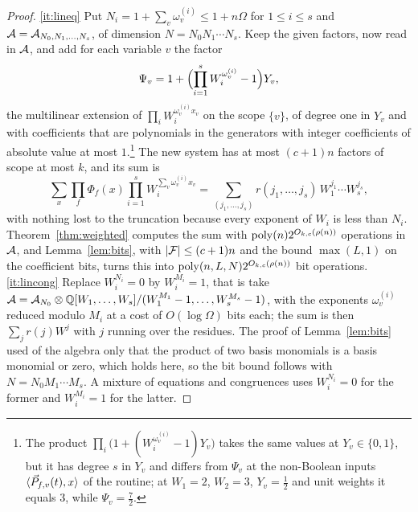 \begin{proof}
\ref{it:lineq} Put $N_i=1+\sum_v\omega^{(i)}_v\le 1+n\Omega$ for $1\le i\le s$ and
$\mathcal{A}=\mathcal{A}_{N_0,N_1,\dots,N_s}$, of dimension $N=N_0N_1\cdots N_s$. Keep the given
factors, now read in $\mathcal{A}$, and add for each variable $v$ the factor
\[
  \Psi_v=1+\Bigl(\prod_{i=1}^{s}W_i^{\omega^{(i)}_v}-1\Bigr)Y_v ,
\]
the multilinear extension of $\prod_iW_i^{\omega^{(i)}_vx_v}$ on the scope
$\{v\}$, of degree one in $Y_v$ and with coefficients that are polynomials in
the generators with integer coefficients of absolute value at most
$1$.\footnote{The product $\prod_i\bigl(1+(W_i^{\omega^{(i)}_v}-1)Y_v\bigr)$ takes
the same values at $Y_v\in\{0,1\}$, but it has degree $s$ in $Y_v$ and differs from
$\Psi_v$ at the non-Boolean inputs $\langle \vec{P}_{f,v}(t),x\rangle$ of the routine; at
$W_1=2$, $W_2=3$, $Y_v=\frac12$ and unit weights it equals $3$, while $\Psi_v=\frac72$.} The new
system has at most $(c+1)n$ factors of scope at most $k$, and its sum is
\[
  \sum_x\prod_f\Phi_f(x)\prod_{i=1}^{s}W_i^{\sum_v\omega^{(i)}_vx_v}
  =\sum_{(j_1,\dots,j_s)}r(j_1,\dots,j_s)\,W_1^{j_1}\cdots W_s^{j_s},
\]
with nothing lost to the truncation because every exponent of $W_i$ is less than
$N_i$. Theorem~\ref{thm:weighted} computes the sum with
$\operatorname{poly}(n)2^{O_{k,c}(\rho(n))}$ operations in $\mathcal{A}$, and Lemma~\ref{lem:bits},
with $|\mathcal{F}|\le(c+1)n$ and the bound $\max(L,1)$ on the coefficient bits, turns
this into $\operatorname{poly}(n,L,N)2^{O_{k,c}(\rho(n))}$ bit operations.
\ref{it:lincong} Replace $W_i^{N_i}=0$ by $W_i^{M_i}=1$, that is take
$\mathcal{A}=\mathcal{A}_{N_0}\otimes\mathbb{Q}[W_1,\dots,W_s]/(W_1^{M_1}-1,\dots,W_s^{M_s}-1)$, with the
exponents $\omega^{(i)}_v$ reduced modulo $M_i$ at a cost of $O(\log\Omega)$ bits
each; the sum is then $\sum_jr(j)W^{j}$ with $j$ running over the residues. The
proof of Lemma~\ref{lem:bits} used of the algebra only that the product of two
basis monomials is a basis monomial or zero, which holds here, so the bit bound
follows with $N=N_0M_1\cdots M_s$. A mixture of equations and congruences uses
$W_i^{N_i}=0$ for the former and $W_i^{M_i}=1$ for the latter.
\end{proof}

